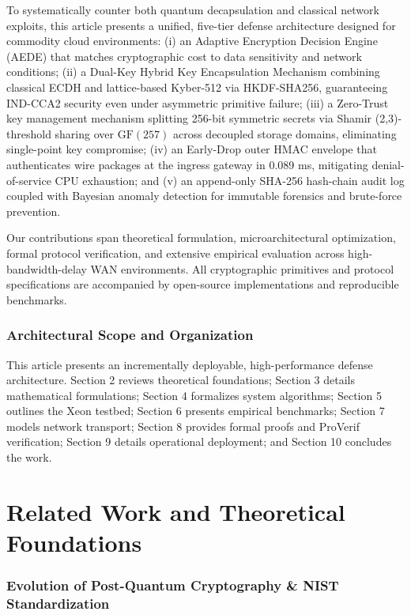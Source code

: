 \documentclass[5p,times]{elsarticle}
\begin{document}
To systematically counter both quantum decapsulation and classical network exploits, this article presents a unified, five-tier defense architecture designed for commodity cloud environments: (i) an Adaptive Encryption Decision Engine (AEDE) that matches cryptographic cost to data sensitivity and network conditions; (ii) a Dual-Key Hybrid Key Encapsulation Mechanism combining classical ECDH and lattice-based Kyber-512 via HKDF-SHA256, guaranteeing IND-CCA2 security even under asymmetric primitive failure; (iii) a Zero-Trust key management mechanism splitting 256-bit symmetric secrets via Shamir (2,3)-threshold sharing over $\text{GF}(257)$ across decoupled storage domains, eliminating single-point key compromise; (iv) an Early-Drop outer HMAC envelope that authenticates wire packages at the ingress gateway in 0.089 ms, mitigating denial-of-service CPU exhaustion; and (v) an append-only SHA-256 hash-chain audit log coupled with Bayesian anomaly detection for immutable forensics and brute-force prevention.

Our contributions span theoretical formulation, microarchitectural optimization, formal protocol verification, and extensive empirical evaluation across high-bandwidth-delay WAN environments. All cryptographic primitives and protocol specifications are accompanied by open-source implementations and reproducible benchmarks.


\subsubsection{Architectural Scope and Organization}

This article presents an incrementally deployable, high-performance defense architecture. Section 2 reviews theoretical foundations; Section 3 details mathematical formulations; Section 4 formalizes system algorithms; Section 5 outlines the Xeon testbed; Section 6 presents empirical benchmarks; Section 7 models network transport; Section 8 provides formal proofs and ProVerif verification; Section 9 details operational deployment; and Section 10 concludes the work.


\FloatBarrier
\section{Related Work and Theoretical Foundations}


\subsubsection{Evolution of Post-Quantum Cryptography \& NIST Standardization}
\end{document}
